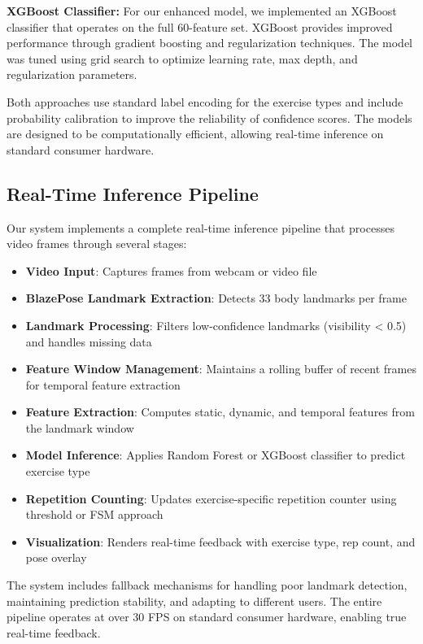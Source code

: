 \documentclass[conference]{IEEEtran}
\begin{document}
\textbf{XGBoost Classifier:} For our enhanced model, we implemented an XGBoost classifier that operates on the full 60-feature set. XGBoost provides improved performance through gradient boosting and regularization techniques. The model was tuned using grid search to optimize learning rate, max depth, and regularization parameters.

Both approaches use standard label encoding for the exercise types and include probability calibration to improve the reliability of confidence scores. The models are designed to be computationally efficient, allowing real-time inference on standard consumer hardware.

\subsection{Real-Time Inference Pipeline}
Our system implements a complete real-time inference pipeline that processes video frames through several stages:

\begin{itemize}[leftmargin=*]
  \item \textbf{Video Input}: Captures frames from webcam or video file
  \item \textbf{BlazePose Landmark Extraction}: Detects 33 body landmarks per frame
  \item \textbf{Landmark Processing}: Filters low-confidence landmarks (visibility < 0.5) and handles missing data
  \item \textbf{Feature Window Management}: Maintains a rolling buffer of recent frames for temporal feature extraction
  \item \textbf{Feature Extraction}: Computes static, dynamic, and temporal features from the landmark window
  \item \textbf{Model Inference}: Applies Random Forest or XGBoost classifier to predict exercise type
  \item \textbf{Repetition Counting}: Updates exercise-specific repetition counter using threshold or FSM approach
  \item \textbf{Visualization}: Renders real-time feedback with exercise type, rep count, and pose overlay
\end{itemize}

The system includes fallback mechanisms for handling poor landmark detection, maintaining prediction stability, and adapting to different users. The entire pipeline operates at over 30 FPS on standard consumer hardware, enabling true real-time feedback.
\end{document}
